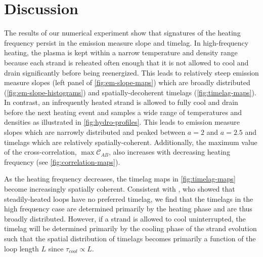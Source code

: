 
\section{Discussion}\label{discussion}

The results of our numerical experiment show that signatures of the heating frequency persist in the emission measure slope and timelag. In high-frequency heating, the plasma is kept within a narrow temperature and density range because each strand is reheated often enough that it is not allowed to cool and drain significantly before being reenergized. This leads to relatively steep emission measure slopes (left panel of \autoref{fig:em-slope-maps}) which are broadly distributed (\autoref{fig:em-slope-histograms}) and spatially-decoherent timelags (\autoref{fig:timelag-maps}). In contrast, an infrequently heated strand is allowed to fully cool and drain before the next heating event and samples a wide range of temperatures and densities as illustrated in \autoref{fig:hydro-profiles}. This leads to emission measure slopes which are narrowly distributed and peaked between $a=2$ and $a=2.5$ and timelags which are relatively spatially-coherent. Additionally, the maximum value of the cross-correlation, $\max\mathcal{C}_{AB}$, also increases with decreasing heating frequency (see \autoref{fig:correlation-maps}).

As the heating frequency decreases, the timelag maps in \autoref{fig:timelag-maps} become increasingly spatially coherent. Consistent with \citet{viall_signatures_2016}, who showed that steadily-heated loops have no preferred timelag, we find that the timelags in the high frequency case are determined primarily by the heating phase and are thus broadly distributed. However, if a strand is allowed to cool uninterrupted, the timelag will be determined primarily by the cooling phase of the strand evolution such that the spatial distribution of timelags becomes primarily a function of the loop length $L$ since $\tau_{cool}\propto L$.

